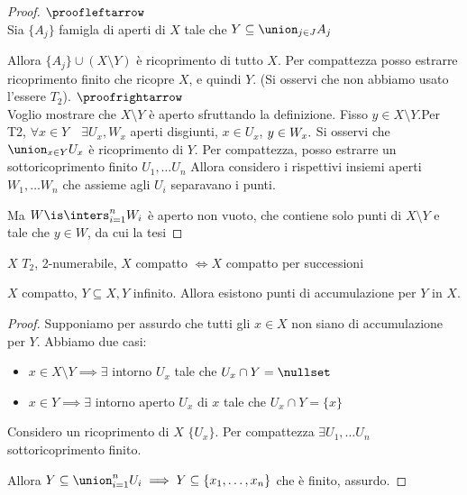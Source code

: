 \begin{proof}
 $\\\proofleftarrow$\\
 Sia $ \{ A_j  \}$ famigla di aperti di $X$ tale che $Y\subseteq \union_{j\in J}A_j$
 
 Allora $ \{ A_j  \} \cup (X\setminus Y)$ è ricoprimento di tutto $X$.
 Per compattezza posso estrarre ricoprimento finito che ricopre $X$, e quindi $Y$. (Si osservi che non abbiamo usato l'essere $T_2$).
 $\\\proofrightarrow$\\
 Voglio mostrare che $X\setminus Y$ è aperto sfruttando la definizione.
 Fisso $y\in X\setminus Y$.Per T2, $\forall x\in Y\quad \exists U_x, W_x$ aperti disgiunti, $x\in U_x$, $y\in W_x.\\$ 
 Si osservi che $\union_{x\in Y}U_x$ è ricoprimento di $Y$. Per compattezza, posso estrarre un sottoricoprimento finito $U_1,\dots U_n$
 Allora considero i rispettivi insiemi aperti $W_1,\dots W_n$ che assieme agli $U_i$ separavano i punti.
  
 Ma $W\is \inters_{i=1}^nW_i$ è aperto non vuoto, che contiene solo punti di $X\setminus Y$ e tale che $y\in W$, da cui la tesi  
 \end{proof}
\begin{prop}
 $X$ $T_2$, 2-numerabile, $ X$ compatto $\iff X$ compatto per successioni
\end{prop}
 \begin{lemma}
  $X$ compatto, $Y\subseteq X, Y$ infinito. Allora esistono punti di accumulazione per $Y$ in $X$.
 \end{lemma}
 \begin{proof}
  Supponiamo per assurdo che tutti gli $x\in X$ non siano di accumulazione per $Y$. Abbiamo due casi:
	\begin{itemize}
	 \item $x\in X\setminus Y\implies \exists$ intorno $U_x$ tale che $U_x\cap Y = \nullset$
	 \item $x\in Y\implies \exists$ intorno aperto $U_x$ di $x$ tale che $U_x\cap Y = \{ x \}$
	\end{itemize}
  Considero un ricoprimento di $X$ $\{ U_x \}$. Per compattezza $\exists U_1,\dots U_n$ sottoricoprimento finito.
  
  Allora $Y\subseteq \union_{i=1}^nU_i\implies Y\subseteq \left \{ x_1,\dots,x_n\right \}$ che è finito, assurdo.
 \end{proof}







